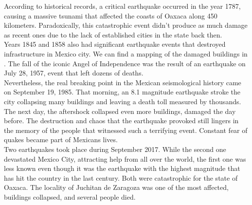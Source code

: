 According to historical records, a critical earthquake occurred in the year 1787, causing a massive tsunami that affected the coasts of Oaxaca along 450 kilometers. Paradoxically, this catastrophic event didn't produce as much damage as recent ones due to the lack of established cities in the state back then.\\

Years 1845 and 1858 also had significant earthquake events that destroyed infrastructure in Mexico city. We can find a mapping of the damaged buildings in \cite{AG3316}. The fall of the iconic Angel of Independence was the result of an earthquake on July 28, 1957, event that left dozens of deaths.\\

Nevertheless, the real breaking point in the Mexican seismological history came on September 19, 1985. That morning, an 8.1 magnitude earthquake stroke the city collapsing many buildings and leaving a death toll measured by thousands. The next day, the aftershock collapsed even more buildings, damaged the day before. The destruction and chaos that the earthquake provoked still lingers in the memory of the people that witnessed such a terrifying event. Constant fear of quakes became part of Mexicans lives.\\

Two earthquakes took place during September 2017. While the second one devastated Mexico City, attracting help from all over the world, the first one was less known even though it was the earthquake with the highest magnitude that has hit the country in the last century. Both were catastrophic for the state of Oaxaca. The locality of Juchitan de Zaragoza was one of the most affected, buildings collapsed, and several people died.\\


